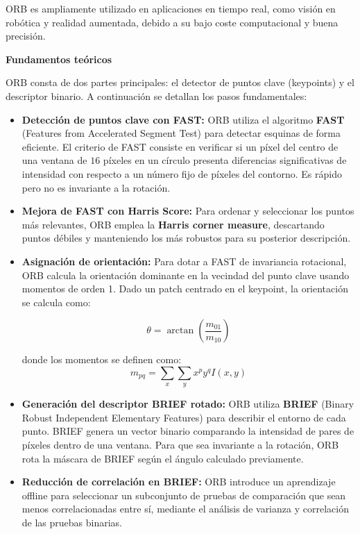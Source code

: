 \documentclass[a4paper]{article}
\begin{document}
    ORB es ampliamente utilizado en aplicaciones en tiempo real, como visión en robótica y realidad aumentada, debido a su bajo coste computacional y buena precisión.

    \par\vspace{0.5cm}
    \textbf{Fundamentos teóricos}
    \par\vspace{0.5cm}

    ORB consta de dos partes principales: el detector de puntos clave (keypoints) y el descriptor binario. A continuación se detallan los pasos fundamentales:

    \begin{itemize}
        \item \textbf{Detección de puntos clave con FAST:}  
        ORB utiliza el algoritmo \textbf{FAST} (Features from Accelerated Segment Test) para detectar esquinas de forma eficiente. El criterio de FAST consiste en verificar si un píxel del centro de una ventana de \(16\) píxeles en un círculo presenta diferencias significativas de intensidad con respecto a un número fijo de píxeles del contorno. Es rápido pero no es invariante a la rotación.

        \item \textbf{Mejora de FAST con Harris Score:}  
        Para ordenar y seleccionar los puntos más relevantes, ORB emplea la \textbf{Harris corner measure}, descartando puntos débiles y manteniendo los más robustos para su posterior descripción.

        \item \textbf{Asignación de orientación:}  
        Para dotar a FAST de invariancia rotacional, ORB calcula la orientación dominante en la vecindad del punto clave usando momentos de orden 1. Dado un patch centrado en el keypoint, la orientación se calcula como:

        \[
        \theta = \arctan\left( \frac{m_{01}}{m_{10}} \right)
        \]

        donde los momentos se definen como:
        \[
        m_{pq} = \sum_x \sum_y x^p y^q I(x, y)
        \]

        \item \textbf{Generación del descriptor BRIEF rotado:}  
        ORB utiliza \textbf{BRIEF} (Binary Robust Independent Elementary Features) para describir el entorno de cada punto. BRIEF genera un vector binario comparando la intensidad de pares de píxeles dentro de una ventana. Para que sea invariante a la rotación, ORB rota la máscara de BRIEF según el ángulo calculado previamente.

        \item \textbf{Reducción de correlación en BRIEF:}  
        ORB introduce un aprendizaje offline para seleccionar un subconjunto de pruebas de comparación que sean menos correlacionadas entre sí, mediante el análisis de varianza y correlación de las pruebas binarias.
    \end{itemize}
\end{document}
